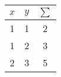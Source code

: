 \begin{center} \begin{tabular}{|c@{$+$}c@{$=$}c|} \hline
  $x$ & $y$ & $\sum$ \\ \hline
  1 & 1 & 2 \\
  1 & 2 & 3 \\
  2 & 3 & 5 \\ \hline
\end{tabular} \end{center}
